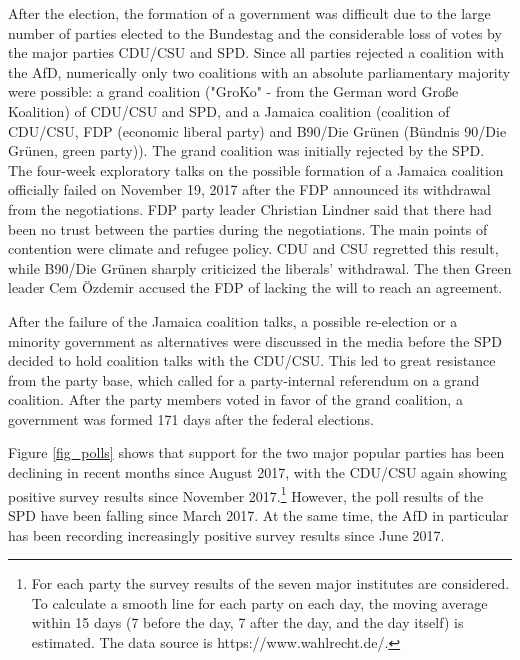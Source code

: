 \documentclass[12pt,a4paper,notitlepage]{article}
\begin{document}
After the election, the formation of a government was difficult due to the large number of parties elected to the Bundestag and the considerable loss of votes by the major parties CDU/CSU and SPD. Since all parties rejected a coalition with the AfD, numerically only two coalitions with an absolute parliamentary majority were possible: a grand coalition ("GroKo" - from the German word Große Koalition) of CDU/CSU and SPD, and a Jamaica coalition (coalition of CDU/CSU, FDP (economic liberal party) and B90/Die Grünen (Bündnis 90/Die Grünen, green party)). The grand coalition was initially rejected by the SPD. The four-week exploratory talks on the possible formation of a Jamaica coalition officially failed on November 19, 2017 after the FDP announced its withdrawal from the negotiations. FDP party leader Christian Lindner said that there had been no trust between the parties during the negotiations. The main points of contention were climate and refugee policy. CDU and CSU regretted this result, while B90/Die Grünen sharply criticized the liberals' withdrawal. The then Green leader Cem Özdemir accused the FDP of lacking the will to reach an agreement.

After the failure of the Jamaica coalition talks, a possible re-election or a minority government as alternatives were discussed in the media before the SPD decided to hold coalition talks with the CDU/CSU. This led to great resistance from the party base, which called for a party-internal referendum on a grand coalition. After the party members voted in favor of the grand coalition, a government was formed 171 days after the federal elections. 

Figure \ref{fig_polls} shows that support for the two major popular parties has been declining in recent months since August 2017, with the CDU/CSU again showing positive survey results since November 2017.\footnote{For each party the survey results of the seven major institutes are considered. To calculate a smooth line for each party on each day, the moving average within 15 days (7 before the day, 7 after the day, and the day itself) is estimated. The data source is https://www.wahlrecht.de/.} However, the poll results of the SPD have been falling since March 2017. At the same time, the AfD in particular has been recording increasingly positive survey results since June 2017.  
\end{document}
